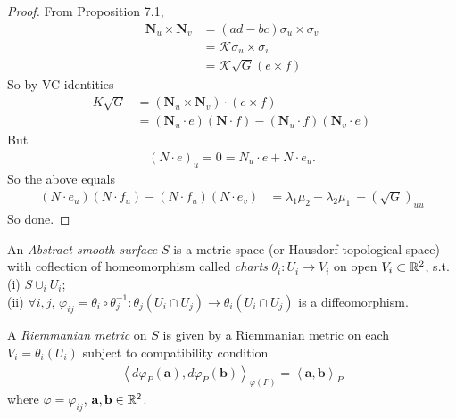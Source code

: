 \documentclass[a4paper]{article}
\begin{document}
\begin{thm}
\begin{proof}
From Proposition 7.1,
\begin{equation*}
\begin{aligned}
\mathbf{N}_u \times \mathbf{N}_v &= (ad-bc) \sigma_u \times \sigma_v\\
&= \mathcal{K} \sigma_u \times \sigma_v\\
&= \mathcal{K} \sqrt{G}(e \times f)
\end{aligned}
\end{equation*}
So by VC identities
\begin{equation*}
\begin{aligned}
K\sqrt{G} &= (\mathbf{N}_u \times \mathbf{N}_v) \cdot (e \times f)\\
&= (\mathbf{N}_u \cdot e) (\mathbf{N} \cdot f) - (\mathbf{N}_u \cdot f) (\mathbf{N}_v \cdot e)
\end{aligned}
\end{equation*}
But
\begin{equation*}
\begin{aligned}
(N\cdot e)_u = 0 = N_u \cdot e + N \cdot e_u.
\end{aligned}
\end{equation*}
So the above equals
\begin{equation*}
\begin{aligned}
(N \cdot e_u) (N \cdot f_u) - (N \cdot f_u) (N \cdot e_v) &= \lambda_1\mu_2 - \lambda_2 \mu_1 \ -(\sqrt{G})_{uu}
\end{aligned}
\end{equation*}
So done.
\end{proof}
\end{thm}

\begin{defi}
An \emph{Abstract smooth surface} $S$ is a metric space (or Hausdorf topological space) with coflection of homeomorphism called \emph{charts} $\theta_i: U_i \to V_i$ on open $V_i \subset \mathbb{R}^2$, s.t.\\
(i) $S \cup_i U_i$;\\
(ii) $\forall i,j$, $\varphi_{ij} = \theta_i \circ \theta_j^{-1} : \theta_j (U_i \cap U_j) \to \theta_i (U_i \cap U_j)$ is a diffeomorphism.

A \emph{Riemmanian metric} on $S$ is given by a Riemmanian metric on each $V_i = \theta_i(U_i)$ subject to compatibility condition
\begin{equation*}
\begin{aligned}
\left<d\varphi_P(\mathbf{a}),d\varphi_P(\mathbf{b})\right>_{\varphi(P)} = \left<\mathbf{a},\mathbf{b}\right>_P
\end{aligned}
\end{equation*}
where $\varphi = \varphi_{ij}$, $\mathbf{a},\mathbf{b} \in \mathbb{R}^2$.
\end{defi}
\end{document}
